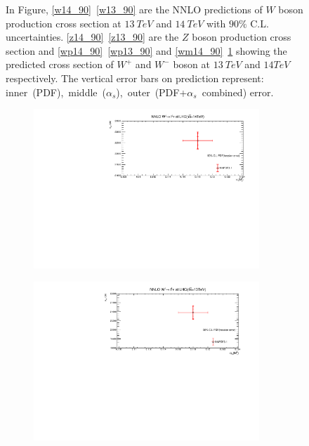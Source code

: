 \begin{figure}[H]
\begin{subfigure}{0.49\textwidth}
\vspace*{-8mm}
\caption{}
\label{wm13_90}
\end{subfigure}
\caption{In Figure, \ref{w14_90}~\ref{w13_90} are the NNLO predictions of $W$ boson production cross section at $13~TeV$ and $14~TeV$ with $90\%$ C.L. uncertainties. \ref{z14_90}~\ref{z13_90} are the $Z$ boson production cross section and \ref{wp14_90}~\ref{wp13_90} and \ref{wm14_90}~\ref{wm13_90} showing the predicted cross section of $W^{+}$ and $W^{-}$ boson at $13~TeV$ and $14TeV$ respectively. The vertical error bars on prediction represent: inner~(PDF),~middle~($\alpha_{s}$),~outer~(PDF+$\alpha_{s}$~combined) error.} 
\label{13tev3}
\end{figure}


\begin{figure}[H]
\centering
\begin{subfigure}{0.49\textwidth}
\includegraphics[height=6cm ,width=\textwidth]{chapter4/W14_hessian.pdf}
\vspace*{-8mm}
\caption{}
\label{w14_he}
\end{subfigure}
\begin{subfigure}{0.49\textwidth}
\includegraphics[height=6cm, width=\textwidth]{chapter4/W13_hessian.pdf}
\vspace*{-8mm}
\caption{}
\label{w13_he}
\end{subfigure}
\begin{subfigure}{0.49\textwidth}

\end{subfigure}
\end{figure}

